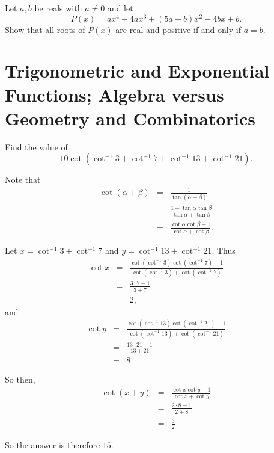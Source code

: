 %	


\begin{question}[name={2023 Pan African Math Olympiad, \href{https://artofproblemsolving.com/community/c6h3077077p27789931}{Problem 5}}]
	Let $a, b$ be reals with $a \neq 0$ and let$$P(x)=ax^4-4ax^3+(5a+b)x^2-4bx+b.$$Show that all roots of $P(x)$ are real and positive if and only if $a=b$.
\end{question}



\section{Trigonometric and Exponential Functions; Algebra versus  Geometry and Combinatorics}

%
%
\begin{question}[name={1984 AIME, \href{https://artofproblemsolving.com/community/c4h66515p392631}{Problem 13}}]
	Find the value of $$10\cot(\cot^{-1}3+\cot^{-1}7+\cot^{-1}13+\cot^{-1}21).$$
\end{question}


\begin{solution}[name={Solution by joml88}]
	Note that
	\begin{eqnarray*} \cot(\alpha+\beta) &=& \frac 1{\tan(\alpha+\beta)}\\ &=& \frac{1-\tan\alpha\tan\beta}{\tan\alpha+\tan\beta}\\ &=& \frac{\cot\alpha\cot\beta-1}{\cot\alpha+\cot\beta}. \end{eqnarray*}
	
	Let $x=\cot^{-1}3+\cot^{-1}7$ and $y=\cot^{-1}13+\cot^{-1}21.$ Thus
	\begin{eqnarray*} \cot x &=& \frac{\cot(\cot^{-1}3)\cot(\cot^{-1}7)-1}{\cot(\cot^{-1}3)+\cot(\cot^{-1}7)}\\ &=& \frac{3\cdot 7-1}{3+7}\\ &=& 2, \end{eqnarray*}
	and
	\begin{eqnarray*} \cot y &=& \frac{\cot(\cot^{-1}13)\cot(\cot^{-1}21)-1}{\cot(\cot^{-1}13)+\cot(\cot^{-1}21)}\\ &=& \frac{13\cdot 21-1}{13+21}\\ &=& 8 \end{eqnarray*}
	
	So then,
	\begin{eqnarray*} \cot(x+y) &=& \frac{\cot x\cot y-1}{\cot x+\cot y}\\ &=& \frac{2\cdot 8-1}{2+8}\\ &=& \frac 32 \end{eqnarray*}
	
	So the answer is therefore $\boxed{15}$.
\end{solution}
%
%
%


